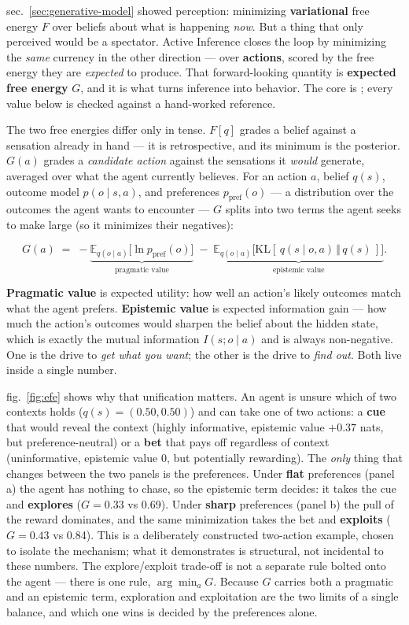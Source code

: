 \documentclass[
  english,
]{article}
\begin{document}
sec.~\ref{sec:generative-model} showed perception: minimizing
\textbf{variational} free energy \(F\) over beliefs about what is
happening \emph{now}. But a thing that only perceived would be a
spectator. Active Inference closes the loop by minimizing the
\emph{same} currency in the other direction --- over \textbf{actions},
scored by the free energy they are \emph{expected} to produce. That
forward-looking quantity is \textbf{expected free energy} \(G\), and it
is what turns inference into behavior. The core is
; every value below is checked
against a hand-worked reference.

The two free energies differ only in tense. \(F[q]\) grades a belief
against a sensation already in hand --- it is retrospective, and its
minimum is the posterior. \(G(a)\) grades a \emph{candidate action}
against the sensations it \emph{would} generate, averaged over what the
agent currently believes. For an action \(a\), belief \(q(s)\), outcome
model \(p(o \mid s, a)\), and preferences \(p_{\text{pref}}(o)\) --- a
distribution over the outcomes the agent wants to encounter --- \(G\)
splits into two terms the agent seeks to make large (so it minimizes
their negatives):

\[
G(a) \;=\; -\underbrace{\mathbb{E}_{q(o\mid a)}\big[\ln p_{\text{pref}}(o)\big]}_{\text{pragmatic value}}
\;-\; \underbrace{\mathbb{E}_{q(o\mid a)}\!\big[\mathrm{KL}[\,q(s\mid o,a)\,\Vert\,q(s)\,]\big]}_{\text{epistemic value}}.
\]

\textbf{Pragmatic value} is expected utility: how well an action's
likely outcomes match what the agent prefers. \textbf{Epistemic value}
is expected information gain --- how much the action's outcomes would
sharpen the belief about the hidden state, which is exactly the mutual
information \(I(s; o \mid a)\) and is always non-negative. One is the
drive to \emph{get what you want}; the other is the drive to \emph{find
out}. Both live inside a single number.

fig.~\ref{fig:efe} shows why that unification matters. An agent is
unsure which of two contexts holds (\(q(s) = (0.50, 0.50)\)) and can
take one of two actions: a \textbf{cue} that would reveal the context
(highly informative, epistemic value \(+0.37\) nats, but
preference-neutral) or a \textbf{bet} that pays off regardless of
context (uninformative, epistemic value \(0\), but potentially
rewarding). The \emph{only} thing that changes between the two panels is
the preferences. Under \textbf{flat} preferences (panel a) the agent has
nothing to chase, so the epistemic term decides: it takes the cue and
\textbf{explores} (\(G = 0.33\) vs 0.69). Under \textbf{sharp}
preferences (panel b) the pull of the reward dominates, and the same
minimization takes the bet and \textbf{exploits} (\(G = 0.43\) vs 0.84).
This is a deliberately constructed two-action example, chosen to isolate
the mechanism; what it demonstrates is structural, not incidental to
these numbers. The explore/exploit trade-off is not a separate rule
bolted onto the agent --- there is one rule, \(\arg\min_a G\). Because
\(G\) carries both a pragmatic and an epistemic term, exploration and
exploitation are the two limits of a single balance, and which one wins
is decided by the preferences alone.
\end{document}
